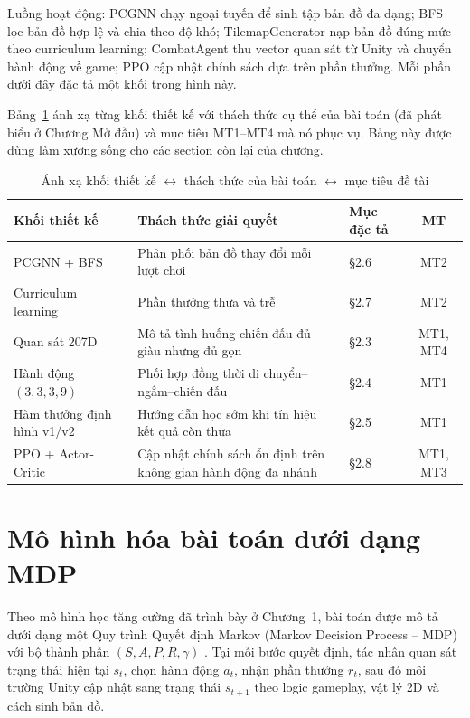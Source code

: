 Luồng hoạt động: PCGNN chạy ngoại tuyến để sinh tập bản đồ đa dạng; BFS lọc bản đồ hợp lệ và chia theo độ khó; TilemapGenerator nạp bản đồ đúng mức theo curriculum learning; CombatAgent thu vector quan sát từ Unity và chuyển hành động về game; PPO cập nhật chính sách dựa trên phần thưởng. Mỗi phần dưới đây đặc tả một khối trong hình này.

Bảng~\ref{tab:design_block_mapping} ánh xạ từng khối thiết kế với thách thức cụ thể của bài toán (đã phát biểu ở Chương Mở đầu) và mục tiêu MT1--MT4 mà nó phục vụ. Bảng này được dùng làm xương sống cho các section còn lại của chương.

\begin{table}[H]
    \centering
    \small
    \caption{Ánh xạ khối thiết kế $\leftrightarrow$ thách thức của bài toán $\leftrightarrow$ mục tiêu đề tài}
    \label{tab:design_block_mapping}
    \begin{tabular}{|p{3.4cm}|p{4.5cm}|p{3.5cm}|c|}
        \hline
        \textbf{Khối thiết kế} & \textbf{Thách thức giải quyết} & \textbf{Mục đặc tả} & \textbf{MT} \\
        \hline
        PCGNN + BFS & Phân phối bản đồ thay đổi mỗi lượt chơi & §2.6 & MT2 \\
        \hline
        Curriculum learning & Phần thưởng thưa và trễ & §2.7 & MT2 \\
        \hline
        Quan sát 207D & Mô tả tình huống chiến đấu đủ giàu nhưng đủ gọn & §2.3 & MT1, MT4 \\
        \hline
        Hành động $(3,3,3,9)$ & Phối hợp đồng thời di chuyển--ngắm--chiến đấu & §2.4 & MT1 \\
        \hline
        Hàm thưởng định hình v1/v2 & Hướng dẫn học sớm khi tín hiệu kết quả còn thưa & §2.5 & MT1 \\
        \hline
        PPO + Actor-Critic & Cập nhật chính sách ổn định trên không gian hành động đa nhánh & §2.8 & MT1, MT3 \\
        \hline
    \end{tabular}
\end{table}

\section{Mô hình hóa bài toán dưới dạng MDP}

Theo mô hình học tăng cường đã trình bày ở Chương~1, bài toán được mô tả dưới dạng một Quy trình Quyết định Markov (Markov Decision Process -- MDP) với bộ thành phần $(S,A,P,R,\gamma)$ \cite{Schulman2017}. Tại mỗi bước quyết định, tác nhân quan sát trạng thái hiện tại $s_t$, chọn hành động $a_t$, nhận phần thưởng $r_t$, sau đó môi trường Unity cập nhật sang trạng thái $s_{t+1}$ theo logic gameplay, vật lý 2D và cách sinh bản đồ.

